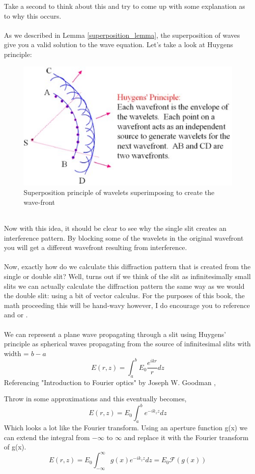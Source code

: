 \documentclass{article}
\begin{document}
Take a second to think about this and try to come up with some explanation as to why this occurs.
\\
\pagebreak
\\
As we described in Lemma \ref{superposition_lemma}, the superposition of waves give you a valid solution to the wave equation. Let's take a look at Huygens principle:
\begin{figure}[!phbt]
    \centering
    \includegraphics[width=0.5\linewidth]{img/Huygens.eps}
    \caption{Superposition principle of wavelets superimposing to create the wave-front}
    \label{fig:huygens}
\end{figure}
\\
Now with this idea, it should be clear to see why the single slit creates an interference pattern. By blocking some of the wavelets in the original wavefront you will get a different wavefront resulting from interference.
\\
\\
Now, exactly how do we calculate this diffraction pattern that is created from the single or double slit? Well, turns out if we think of the slit as infinitesimally small slits we can actually calculate the diffraction pattern the same way as we would the double slit: using a bit of vector calculus. For the purposes of this book, the math proceeding this will be hand-wavy however, I do encourage you to reference \cite{MIT} and \cite{fourier} or \cite{hecht_2017}.
\\
\\
We can represent a plane wave propagating through a slit using Huygens' principle as spherical waves propagating from the source of infinitesimal slits with width = $b-a$
\begin{equation}
    E(r,z) = \int_a^b E_0 \frac{e^{ikr}}{r} dz
\end{equation}
Referencing "Introduction to Fourier optics" by Joseph W. Goodman \cite{fourier},

Throw in some approximations and this eventually becomes,
\begin{equation}
    E(r,z) = E_0 \int_a^b e^{-ik_z z} dz
\end{equation}
Which looks a lot like the Fourier transform. Using an aperture function g(x) we can extend the integral from $-\infty$ to $\infty$ and replace it with the Fourier transform of g(x).
\begin{equation}
    E(r,z) = E_0 \int_{-\infty}^\infty g(x) e^{-ik_z z} dz = E_0\mathcal{F}(g(x))
\end{equation}
\end{document}
